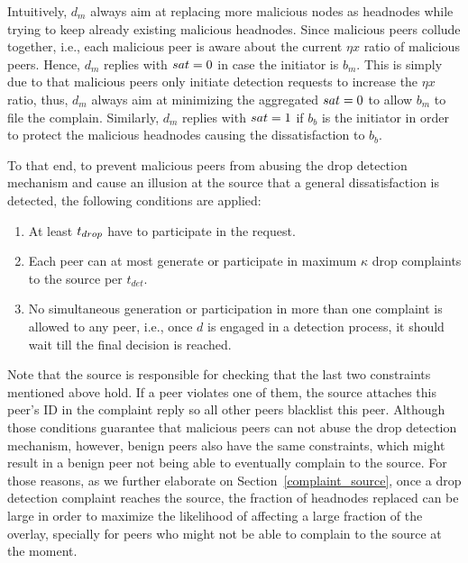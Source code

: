 Intuitively, $d_m$ always aim at replacing more malicious nodes as headnodes while trying to keep already existing malicious headnodes.
Since malicious peers collude together, i.e., each malicious peer is aware about the current $\eta x$ ratio of malicious peers.
Hence, $d_m$ replies with $sat=0$ in case the initiator is $b_m$. 
This is simply due to that malicious peers only initiate detection requests to increase the $\eta x$ ratio, thus, $d_m$ always aim at minimizing the aggregated $sat=0$ to allow $b_m$ to file the complain.
Similarly, $d_m$ replies with $sat=1$ if $b_b$ is the initiator in order to protect the malicious headnodes causing the dissatisfaction to $b_b$.


To that end, to prevent malicious peers from abusing the drop detection mechanism and cause an illusion at the source that a general dissatisfaction is detected, the following conditions are applied:
\begin{enumerate}
\item At least $t_{drop}$ have to participate in the request. 
 \item Each peer can at most generate or participate in maximum $\kappa$ drop complaints to the source per $t_{det}$.
 \item No simultaneous generation or participation in more than one complaint is allowed to any peer, i.e., once $d$ is engaged in a detection process, it should wait till the final decision is reached.
\end{enumerate}
Note that the source is responsible for checking that the last two constraints mentioned above hold.
If a peer violates one of them, the source attaches this peer's ID in the complaint reply so all other peers blacklist this peer.
 Although those conditions guarantee that malicious peers can not abuse the drop detection mechanism,
however, benign peers also have the same constraints, which might result in a benign peer not being able to eventually complain to the source.
For those reasons, as we further elaborate on Section~\ref{complaint_source}, once a drop detection complaint reaches the source,
the fraction of headnodes replaced can be large in order to maximize the likelihood of affecting a large fraction of the overlay, specially for peers who might not be able to complain to the source at the moment.


